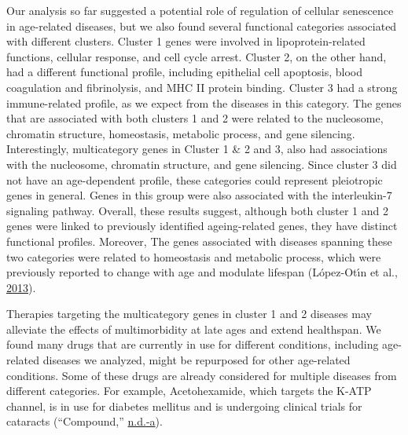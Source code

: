 \documentclass[12pt,twoside]{unicam}
\begin{document}
Our analysis so far suggested a potential role of regulation of cellular senescence in age-related diseases, but we also found several functional categories associated with different clusters. Cluster 1 genes were involved in lipoprotein-related functions, cellular response, and cell cycle arrest. Cluster 2, on the other hand, had a different functional profile, including epithelial cell apoptosis, blood coagulation and fibrinolysis, and MHC II protein binding. Cluster 3 had a strong immune-related profile, as we expect from the diseases in this category. The genes that are associated with both clusters 1 and 2 were related to the nucleosome, chromatin structure, homeostasis, metabolic process, and gene silencing. Interestingly, multicategory genes in Cluster 1 \& 2 and 3, also had associations with the nucleosome, chromatin structure, and gene silencing. Since cluster 3 did not have an age-dependent profile, these categories could represent pleiotropic genes in general. Genes in this group were also associated with the interleukin-7 signaling pathway. Overall, these results suggest, although both cluster 1 and 2 genes were linked to previously identified ageing-related genes, they have distinct functional profiles. Moreover, The genes associated with diseases spanning these two categories were related to homeostasis and metabolic process, which were previously reported to change with age and modulate lifespan (López-Otı́n et al., \protect\hyperlink{ref-Lopez-Otin2013}{2013}).

Therapies targeting the multicategory genes in cluster 1 and 2 diseases may alleviate the effects of multimorbidity at late ages and extend healthspan. We found many drugs that are currently in use for different conditions, including age-related diseases we analyzed, might be repurposed for other age-related conditions. Some of these drugs are already considered for multiple diseases from different categories. For example, Acetohexamide, which targets the K-ATP channel, is in use for diabetes mellitus and is undergoing clinical trials for cataracts (``Compound,'' \protect\hyperlink{ref-Acetohexamide2020}{n.d.}\protect\hyperlink{ref-Acetohexamide2020}{-a}).
\end{document}
